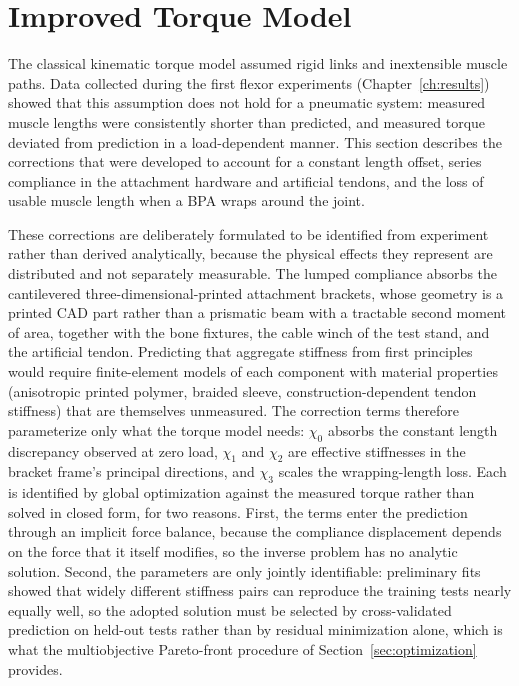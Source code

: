 \section{Improved Torque Model}\label{sec:improved_model}

The classical kinematic torque model assumed rigid links and inextensible muscle paths. Data collected during the first flexor experiments (Chapter~\ref{ch:results}) showed that this assumption does not hold for a pneumatic system: measured muscle lengths were consistently shorter than predicted, and measured torque deviated from prediction in a load-dependent manner. This section describes the corrections that were developed to account for a constant length offset, series compliance in the attachment hardware and artificial tendons, and the loss of usable muscle length when a BPA wraps around the joint.

These corrections are deliberately formulated to be identified from experiment rather than derived analytically, because the physical effects they represent are distributed and not separately measurable. The lumped compliance absorbs the cantilevered three-dimensional-printed attachment brackets, whose geometry is a printed CAD part rather than a prismatic beam with a tractable second moment of area, together with the bone fixtures, the cable winch of the test stand, and the artificial tendon. Predicting that aggregate stiffness from first principles would require finite-element models of each component with material properties (anisotropic printed polymer, braided sleeve, construction-dependent tendon stiffness) that are themselves unmeasured. The correction terms therefore parameterize only what the torque model needs: $\chi_{0}$ absorbs the constant length discrepancy observed at zero load, $\chi_{1}$ and $\chi_{2}$ are effective stiffnesses in the bracket frame's principal directions, and $\chi_{3}$ scales the wrapping-length loss. Each is identified by global optimization against the measured torque rather than solved in closed form, for two reasons. First, the terms enter the prediction through an implicit force balance, because the compliance displacement depends on the force that it itself modifies, so the inverse problem has no analytic solution. Second, the parameters are only jointly identifiable: preliminary fits showed that widely different stiffness pairs can reproduce the training tests nearly equally well, so the adopted solution must be selected by cross-validated prediction on held-out tests rather than by residual minimization alone, which is what the multiobjective Pareto-front procedure of Section~\ref{sec:optimization} provides.

